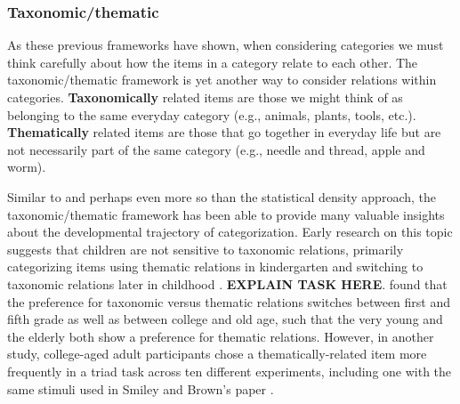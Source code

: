 \documentclass[../dissertation.tex]{subfiles}
\begin{document}
\subsubsection{Taxonomic/thematic}
	As these previous frameworks have shown, when considering categories we must think carefully about how the items in a category relate to each other. The taxonomic/thematic framework is yet another way to consider relations within categories. \textbf{Taxonomically} related items are those we might think of as belonging to the same everyday category (e.g., animals, plants, tools, etc.). \textbf{Thematically} related items are those that go together in everyday life but are not necessarily part of the same category (e.g., needle and thread, apple and worm).  \par
		Similar to and perhaps even more so than the statistical density approach, the taxonomic/thematic framework has been able to provide many valuable insights about the developmental trajectory of categorization. Early research on this topic suggests that children are not sensitive to taxonomic relations, primarily categorizing items using thematic relations in kindergarten and switching to taxonomic relations later in childhood \citep{vygotsky1962language,piaget1964early}. \textbf{EXPLAIN TASK HERE}. \citet{Smiley1979} found that the preference for taxonomic versus thematic relations switches between first and fifth grade as well as between college and old age, such that the very young and the elderly both show a preference for thematic relations. However, in another study, college-aged adult participants chose a thematically-related item more frequently in a triad task across ten different experiments, including one with the same stimuli used in Smiley and Brown's paper \citep{Lin2001}. \par
\end{document}
